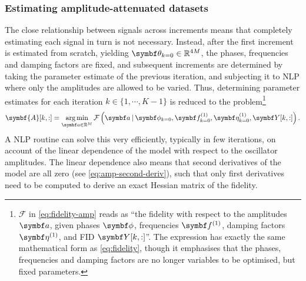 \subsubsection{Estimating amplitude-attenuated datasets}
The close relationship between signals across increments means that completely
estimating each signal in turn is not necessary. Instead, after the first
increment is estimated from scratch, yielding $\bth_{k=0} \in \mathbb{R}^{4M}$,
the phases, frequencies and damping factors are fixed, and subsequent
increments are determined by taking the parameter estimate of the previous
iteration, and subjecting it to \ac{NLP} where only the amplitudes
are allowed to be varied. Thus, determining parameter estimates for each
iteration $k \in \lbrace1, \cdots, K-1\rbrace$ is reduced to the problem\footnote{
    $\mathcal{F}$ in \eqref{eq:fidelity-amp} reads as ``the fidelity
    with respect to the amplitudes $\bda$, given phases $\bdphi$,
    frequencies $\bdfone$, damping factors  $\bdetaone$, and \ac{FID}
    $\bY[k,:]$''. The expression has exactly the same mathematical form as
    \eqref{eq:fidelity}, though it emphasises that the phases, frequencies and
    damping factors are no longer variables to be optimised, but fixed
    parameters.
}
\begin{equation}
    \symbf{A}[k,:] = \argmin_{\bda \in \mathbb{R}^M}
        \mathcal{F}\left(\bda \hspace*{2pt} | \hspace*{2pt}
        \bdphi_{k=0}, \bdfone_{k=0}, \bdetaone_{k=0}, \bY[k,:]\right).
        \label{eq:fidelity-amp}
\end{equation}
A \ac{NLP} routine can solve this very efficiently, typically in few
iterations, on account of the linear dependence of the model with respect to
the oscillator amplitudes. The linear dependence also means that second
derivatives of the model are all zero (see \eqref{eq:amp-second-deriv}),
such that only first derivatives need to be computed to derive an exact Hessian
matrix of the fidelity.

